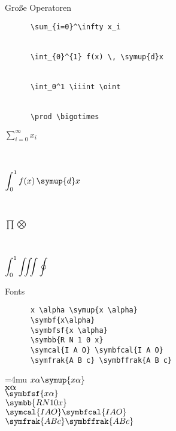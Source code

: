 \begin{frame}[fragile]{Große Operatoren}
  \begin{CodeExample}{0.70}
    \vspace{\baselineskip}
    \begin{lstlisting}
      \sum_{i=0}^\infty x_i


      \int_{0}^{1} f(x) \, \symup{d}x


      \int_0^1 \iiint \oint


      \prod \bigotimes
    \end{lstlisting}
  \CodeResult
  \begin{minipage}[c][3\baselineskip][c]{0.9\textwidth}
      $\displaystyle \sum_{i=0}^\infty x_i$
    \end{minipage} \\\nointerlineskip
    \begin{minipage}[c][3\baselineskip][c]{\textwidth}
      $\displaystyle \int_{0}^{1} f(x) \, \symup{d}x $
    \end{minipage} \\\nointerlineskip
    \begin{minipage}[c][3\baselineskip][c]{\textwidth}
      $\displaystyle \prod \bigotimes$
    \end{minipage} \\\nointerlineskip
    \begin{minipage}[c][3\baselineskip][c]{\textwidth}
      $\displaystyle \smash{\int_0^1} \iiint \oint$
    \end{minipage}
  \end{CodeExample}
\end{frame}

\begin{frame}[fragile]{
  Fonts
  \hfill{}
}
  \begin{CodeExample}{0.70}
    \begin{lstlisting}
      x \alpha \symup{x \alpha}
      \symbf{x\alpha}
      \symbfsf{x \alpha}
      \symbb{R N 1 0 x}
      \symcal{I A O} \symbfcal{I A O}
      \symfrak{A B c} \symbffrak{A B c}
    \end{lstlisting}
  \CodeResult
    \Umathordordspacing\textstyle=4mu
    $x \alpha \symup{x \alpha}$ \\
    $\symbf{x\alpha}$ \\
    $\symbfsf{x \alpha}$ \\
    $\symbb{R N 1 0 x}$ \\
    $\symcal{I A O} \symbfcal{I A O}$ \\
    $\symfrak{A B c} \symbffrak{A B c}$
  \end{CodeExample}
\end{frame}

